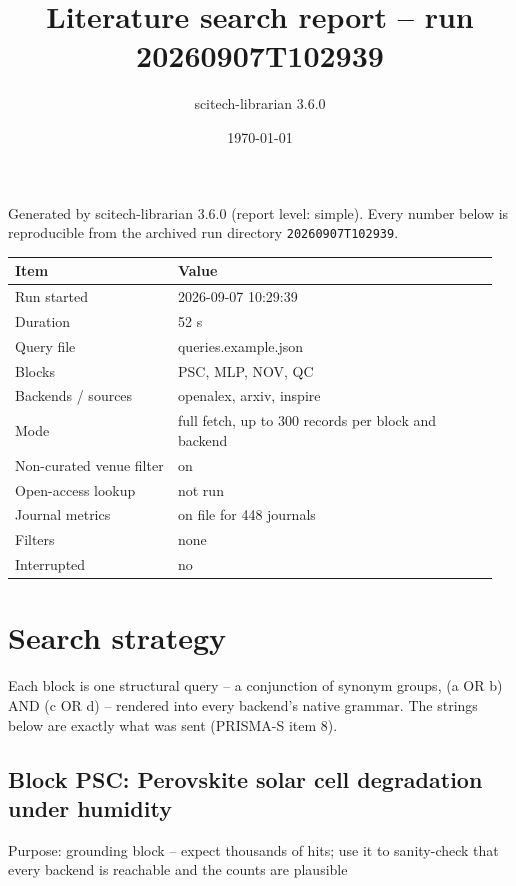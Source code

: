 \documentclass[10pt,a4paper]{article}
\title{Literature search report -- run 20260907T102939}\author{scitech-librarian 3.6.0}\date{\today}
\begin{document}
\maketitle
Generated by scitech-librarian 3.6.0 (report level: simple). Every number below is reproducible from the archived run directory \texttt{20260907T102939}.

{\scriptsize\begin{longtable}{p{0.322\linewidth}p{0.633\linewidth}}
\hline
\textbf{Item} & \textbf{Value} \\ \hline
\endhead
Run started & 2026-09-07 10:29:39 \\
Duration & 52 s \\
Query file & queries.example.json \\
Blocks & PSC, MLP, NOV, QC \\
Backends / sources & openalex, arxiv, inspire \\
Mode & full fetch, up to 300 records per block and backend \\
Non-curated venue filter & on \\
Open-access lookup & not run \\
Journal metrics & on file for 448 journals \\
Filters & none \\
Interrupted & no \\
\hline
\end{longtable}}
\section*{Search strategy}
Each block is one structural query -- a conjunction of synonym groups, (a OR b) AND (c OR d) -- rendered into every backend's native grammar. The strings below are exactly what was sent (PRISMA-S item 8).

\subsection*{Block PSC: Perovskite solar cell degradation under humidity}
Purpose: grounding block -- expect thousands of hits; use it to sanity-check that every backend is reachable and the counts are plausible
\end{document}

